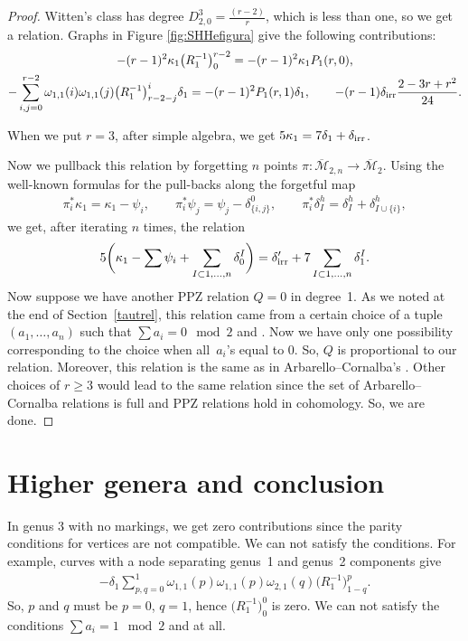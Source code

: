 \documentclass[10pt,a4paper]{amsart}
\def\oM{\overline{\mathcal{M}}}
\numberwithin{equation}{section}
\begin{document}
\begin{proof}
Witten's class has degree
$D^3_{2,0} = \frac{(r-2)}{r}$,
which is less than one, so we get a relation. Graphs in Figure \ref{fig:SHHefigura} give the following contributions:
\begin{gather*}
	-(r-1)^2\kappa_1 \big(R_1^{-1}\big)^{r-2}_0 = -(r-1)^2 \kappa_1 P_1(r,0),
\\
- \sum_{i,j=0}^{r-2}\omega_{1,1}(i)\omega_{1,1}(j)\big(R_1^{-1}\big)^{i}_{r-2-j}\delta_1 = -(r-1)^2 P_1(r,1) \delta_1	,
\qquad
	-(r-1)\delta_{\rm irr} \frac{2-3r+r^2}{24} .
\end{gather*}

When we put $r=3$, after simple algebra, we get
$5\kappa_1 = 7\delta_1 + \delta_{\rm irr}$.

Now we pullback this relation by forgetting $n$ points $\pi\colon \oM_{2,n} \rightarrow \oM_{2}$.
Using the well-known formulas for the pull-backs along the forgetful map
\begin{align*}
 \pi_i^*\kappa_1 = \kappa_1 - \psi_i,\qquad
 \pi_i^*\psi_j = \psi_j - \delta^0_{\{i,j\}},\qquad
 \pi_i^*\delta^h_I = \delta^h_I + \delta^h_{I\cup\{i\}},
\end{align*}
we get, after iterating $n$ times, the relation
\begin{align*}
	5\bigg(\kappa_1 - \sum \psi_i + \sum_{I\subset{1,\dots,n}}\delta_0^{I}\bigg) = \delta_{\rm irr}^{\prime} + 7\sum_{I\subset{1,\dots,n}}\delta_1^{I}.
\end{align*}
 Now suppose we have another PPZ relation $Q=0$ in degree~1. As we noted at the end of Section~\ref{tautrel}, this relation came from a certain choice of a tuple $(a_1,\dots, a_n)$ such that $\sum a_i = 0 \mod 2$ and . Now we have only one possibility corresponding to the choice when all~$a_i$'s equal to 0. So, $Q$ is proportional to our relation. Moreover, this relation is the same as in Arbarello--Cornalba's \cite[Theorem 2.2]{Cor}. Other choices of $r\geq3$ would lead to the same relation since the set of Arbarello--Cornalba relations is full and PPZ relations hold in cohomology. So, we are done.
\end{proof}


\section{Higher genera and conclusion}

In genus 3 with no markings, we get zero contributions since the parity conditions for vertices are not compatible. We can not satisfy the conditions. For example, curves with a node separating genus~1 and genus~2 components give
\begin{align*}
-\delta_1\sum_{p,q=0}^1\omega_{1,1}(p)\omega_{1,1}(p)\omega_{2,1}(q)\big(R_1^{-1}\big)^p_{1-q}.
\end{align*}
So, $p$ and $q$ must be $p=0$, $q=1$, hence $\big(R_1^{-1}\big)^0_{0}$ is zero. We can not satisfy the conditions ${\sum a_i = 1 \mod 2}$ and  at all.
\end{document}
